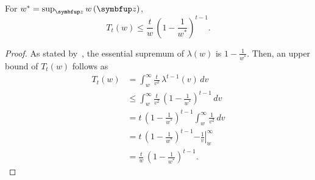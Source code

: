 
\begin{lemma}\label{thm:tn_bound}
  For \(w^* = \sup_{\vz} w\left(\vz\right) \), 
  \[
  T_t\left( w \right) \leq \frac{t}{w} \, {\left(1 - \frac{1}{w^*}\right)}^{t-1}.
  \]
\end{lemma}
\begin{proof}
  As stated by~\citet{Smith96exacttransition}, the essential supremum of \(\lambda\left(w\right)\) is \(1 - \frac{1}{w^*}\).
  Then, an upper bound of \(T_t\left(w\right)\) follows as
  \begin{align}
    T_t\left(w\right) 
    &= \int_w^{\infty} \frac{t}{v^2} \, \lambda^{t-1}\left(v\right)\,dv \\
    &\leq \int_w^{\infty} \frac{t}{v^2} \, {\left(1 - \frac{1}{w^*}\right)}^{t-1}\,dv \\
    &= t \, {\left(1 - \frac{1}{w^*}\right)}^{t-1}  \int_w^{\infty} \frac{1}{v^2} \,dv \\
    &= t \, {\left(1 - \frac{1}{w^*}\right)}^{t-1}  {-\left.\frac{1}{v}\right\rvert^{\infty}_{w}} \\
    &= \frac{t}{w} \, {\left(1 - \frac{1}{w^*}\right)}^{t-1}.
  \end{align}
\end{proof}


